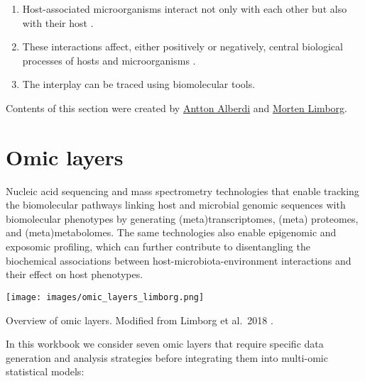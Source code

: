 \documentclass[
]{book}
\providecommand{\tightlist}{%
  \setlength{\itemsep}{0pt}\setlength{\parskip}{0pt}}
\begin{document}
\begin{enumerate}
\def\labelenumi{\arabic{enumi}.}
\tightlist
\item
  Host-associated microorganisms interact not only with each other but also with their host \citep{Fischer2017-wa}.
\item
  These interactions affect, either positively or negatively, central biological processes of hosts and microorganisms \citep{Wu2012-jt}.
\item
  The interplay can be traced using biomolecular tools.
\end{enumerate}

Contents of this section were created by \protect\hyperlink{antton-alberdi}{Antton Alberdi} and \protect\hyperlink{morten-limborg}{Morten Limborg}.

\hypertarget{omic-layers}{%
\section{Omic layers}\label{omic-layers}}

Nucleic acid sequencing and mass spectrometry technologies that enable tracking the biomolecular pathways linking host and microbial genomic sequences with biomolecular phenotypes by generating (meta)transcriptomes, (meta) proteomes, and (meta)metabolomes. The same technologies also enable epigenomic and exposomic profiling, which can further contribute to disentangling the biochemical associations between host-microbiota-environment interactions and their effect on host phenotypes.

\scriptsize

\texttt{[image: images/omic\_layers\_limborg.png]}
\normalsize

Overview of omic layers. Modified from Limborg et al.~2018 \citep{Limborg2018-tf}.

In this workbook we consider seven omic layers that require specific data generation and analysis strategies before integrating them into multi-omic statistical models:
\end{document}

